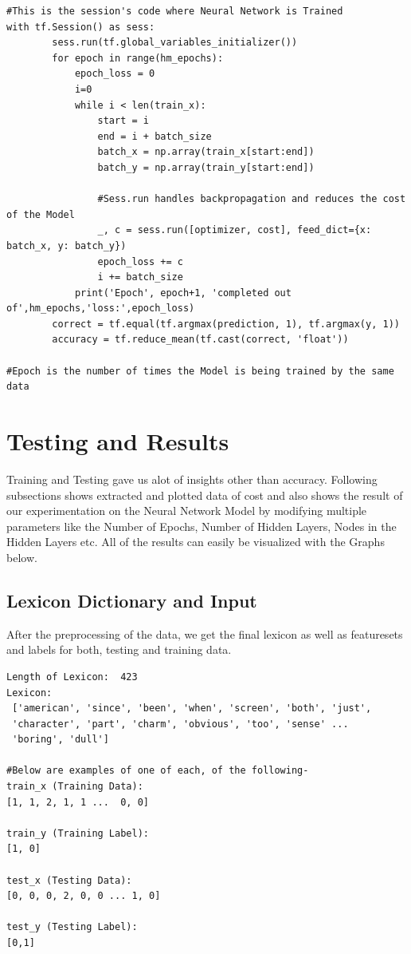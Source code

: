 \begin{verbatim}
#This is the session's code where Neural Network is Trained
with tf.Session() as sess:
        sess.run(tf.global_variables_initializer())
        for epoch in range(hm_epochs):
            epoch_loss = 0
            i=0
            while i < len(train_x):
                start = i
                end = i + batch_size
                batch_x = np.array(train_x[start:end])
                batch_y = np.array(train_y[start:end])
                
                #Sess.run handles backpropagation and reduces the cost of the Model
                _, c = sess.run([optimizer, cost], feed_dict={x: batch_x, y: batch_y})
                epoch_loss += c
                i += batch_size
            print('Epoch', epoch+1, 'completed out of',hm_epochs,'loss:',epoch_loss)
        correct = tf.equal(tf.argmax(prediction, 1), tf.argmax(y, 1))
        accuracy = tf.reduce_mean(tf.cast(correct, 'float'))

#Epoch is the number of times the Model is being trained by the same data
\end{verbatim}

\section{Testing and Results}
Training and Testing gave us alot of insights other than accuracy. Following subsections shows extracted and plotted data of cost and also shows the result of our experimentation on the Neural Network Model by modifying multiple parameters like the Number of Epochs, Number of Hidden Layers, Nodes in the Hidden Layers etc. All of the results can easily be visualized with the Graphs below.

\subsection{Lexicon Dictionary and Input}
After the preprocessing of the data, we get the final lexicon as well as featuresets and labels for both, testing and training data.

\begin{verbatim}
Length of Lexicon:  423
Lexicon: 
 ['american', 'since', 'been', 'when', 'screen', 'both', 'just',
 'character', 'part', 'charm', 'obvious', 'too', 'sense' ...
 'boring', 'dull']
 
#Below are examples of one of each, of the following-
train_x (Training Data): 
[1, 1, 2, 1, 1 ...  0, 0]

train_y (Training Label):
[1, 0]

test_x (Testing Data): 
[0, 0, 0, 2, 0, 0 ... 1, 0]

test_y (Testing Label):
[0,1]
\end{verbatim}


